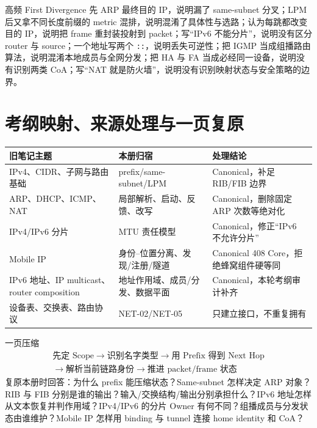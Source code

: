 \documentclass[11pt,a4paper]{ctexart}
\newcommand{\code}[1]{\texttt{#1}}
\begin{document}
\begin{warnbox}{高频 First Divergence}
先 ARP 最终目的 IP，说明漏了 same-subnet 分叉；LPM 后又拿不同长度前缀的 metric 混排，说明混淆了具体性与选路；认为每跳都改变目的 IP，说明把 frame 重封装投射到 packet；写“IPv6 不能分片”，说明没有区分 router 与 source；一个地址写两个 \code{::}，说明丢失可逆性；把 IGMP 当成组播路由算法，说明混淆本地成员与全网分发；把 HA 与 FA 当成必经同一设备，说明没有识别两类 CoA；写“NAT 就是防火墙”，说明没有识别映射状态与安全策略的边界。
\end{warnbox}

\section{考纲映射、来源处理与一页复原}

\begin{center}
\small
\begin{tabularx}{\linewidth}{L{3.2cm}Y Y}
\toprule
旧笔记主题 & 本册归宿 & 处理结论\\
\midrule
IPv4、CIDR、子网与路由基础 & prefix/same-subnet/LPM & Canonical，补足 RIB/FIB 边界\\
ARP、DHCP、ICMP、NAT & 局部解析、启动、反馈、改写 & Canonical，删除固定 ARP 次数等绝对化\\
IPv4/IPv6 分片 & MTU 责任模型 & Canonical，修正“IPv6 不允许分片”\\
Mobile IP & 身份--位置分离、发现/注册/隧道 & Canonical 408 Core，拒绝蜂窝组件硬等同\\
IPv6 地址、IP multicast、router composition & 地址作用域、成员/分发、数据平面 & Canonical，本轮考纲审计补齐\\
设备表、交换表、路由协议 & NET-02/NET-05 & 只建立接口，不重复拥有\\
\bottomrule
\end{tabularx}
\end{center}

\begin{corebox}{一页压缩}
\[
\boxed{\begin{gathered}
\text{先定 Scope}\to\text{识别名字类型}\to\text{用 Prefix 得到 Next Hop}\\
\to\text{解析当前链路身份}\to\text{推进 packet/frame 状态}
\end{gathered}}
\]
复原本册时回答：为什么 prefix 能压缩状态？Same-subnet 怎样决定 ARP 对象？RIB 与 FIB 分别是谁的输出？输入/交换结构/输出分别承担什么？IPv6 地址怎样从文本恢复并判作用域？IPv4/IPv6 的分片 Owner 有何不同？组播成员与分发状态由谁维护？Mobile IP 怎样用 binding 与 tunnel 连接 home identity 和 CoA？
\end{corebox}
\end{document}
